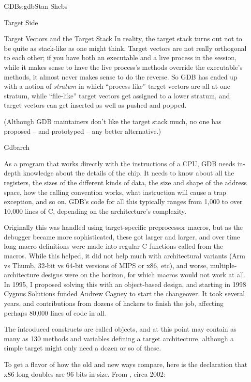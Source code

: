 \begin{aosachapter}{GDB}{s:gdb}{Stan Shebs}
\begin{aosasect1}{Target Side}
\begin{aosasect2}{Target Vectors and the Target Stack}
In reality, the target stack turns out not to be quite as stack-like
as one might think.  Target vectors are not really orthogonal to each
other; if you have both an executable and a live process in the
session, while it makes sense to have the live process's methods
override the executable's methods, it almost never makes sense to do
the reverse.  So GDB has ended up with a notion of {\em stratum} in
which ``process-like'' target vectors are all at one stratum, while
``file-like'' target vectors get assigned to a lower stratum, and
target vectors can get inserted as well as pushed and popped.

(Although GDB maintainers don't like the target stack much, no one has
proposed -- and prototyped -- any better alternative.)

\end{aosasect2}

\begin{aosasect2}{Gdbarch}

As a program that works directly with the instructions of a CPU, GDB
needs in-depth knowledge about the details of the chip.  It needs to
know about all the registers, the sizes of the different kinds of
data, the size and shape of the address space, how the calling
convention works, what instruction will cause a trap exception, and so
on.  GDB's code for all this typically ranges from 1,000 to over
10,000 lines of C, depending on the architecture's complexity.

Originally this was handled using target-specific preprocessor macros,
but as the debugger became more sophisticated, these got larger and
larger, and over time long macro definitions were made into regular C
functions called from the macros.  While this helped, it did not help
much with architectural variants (Arm vs Thumb, 32-bit vs 64-bit
versions of MIPS or x86, etc), and worse, multiple-architecture
designs were on the horizon, for which macros would not work at all.
In 1995, I proposed solving this with an object-based design, and
starting in 1998 Cygnus Solutions funded Andrew Cagney to start the
changeover.  It took several years, and contributions from dozens of
hackers to finish the job, affecting perhaps 80,000 lines of code in
all.

The introduced constructs are called  objects, and at
this point may contain as many as 130 methods and variables defining a
target architecture, although a simple target might only need a dozen
or so of these.

To get a flavor of how the old and new ways compare, here is the
declaration that x86 long doubles are 96 bits in size.  From
, circa 2002:


\end{aosasect2}
\end{aosasect1}
\end{aosachapter}
